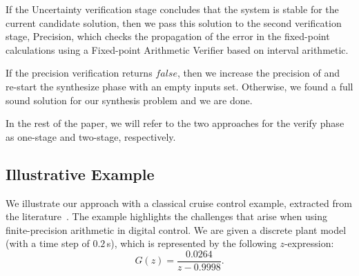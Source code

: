 \documentclass[final]{sig-alternate-05-2015}
\begin{document}
If the {\sc Uncertainty} verification stage concludes that the system is
stable for the current candidate solution, then we pass this solution to the
second verification stage, {\sc Precision}, which checks the propagation of
the error in the fixed-point calculations using a Fixed-point Arithmetic
Verifier based on interval arithmetic.
%
%

If the {\sc precision} verification returns $\mathit{false}$, then we
increase the precision of  and re-start the {\sc
  synthesize} phase with an empty {\sc inputs} set.  Otherwise, we
found a full sound solution for our synthesis problem and we are done.

In the rest of the paper, we will refer to the two approaches 
for the {\sc verify} phase as one-stage and two-stage, respectively.

\subsection{Illustrative Example} \label{sec:running-ex}

We illustrate our approach with a classical cruise control example,
extracted from the literature~\cite{Astrom08}.  The example highlights the
challenges that arise when using finite-precision arithmetic in digital
control.  We are given a discrete plant model (with a time step of
$0.2$\,s), which is represented by the following $z$-expression:
%
\begin{equation}
\label{Eq:running-example-plant}
G(z) = \frac{0.0264}{z-0.9998}.
\end{equation}
\end{document}
